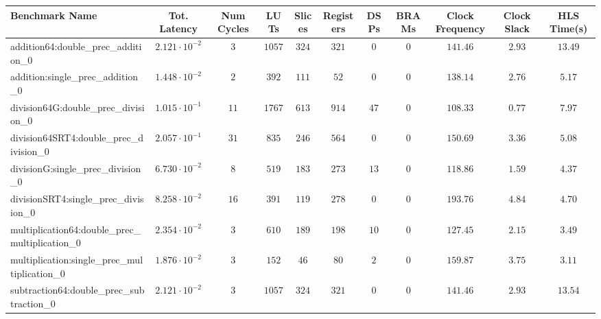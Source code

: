 \begin{tabular}{|l|c|c|c|c|c|c|c|c|c|c|}
\hline
Benchmark Name                                   & Tot. Latency            & Num Cycles & LUTs     & Slices   & Registers & DSPs   & BRAMs & Clock Frequency & Clock Slack & HLS Time(s) \\
\hline
addition64:double\_prec\_addition\_0             & $ 2.121 \cdot 10^{-2} $ & $ 3      $ & $ 1057 $ & $ 324  $ & $ 321   $ & $ 0  $ & $ 0 $ & $ 141.46      $ & $ 2.93    $ & $ 13.49   $ \\
addition:single\_prec\_addition\_0               & $ 1.448 \cdot 10^{-2} $ & $ 2      $ & $ 392  $ & $ 111  $ & $ 52    $ & $ 0  $ & $ 0 $ & $ 138.14      $ & $ 2.76    $ & $ 5.17    $ \\
division64G:double\_prec\_division\_0            & $ 1.015 \cdot 10^{-1} $ & $ 11     $ & $ 1767 $ & $ 613  $ & $ 914   $ & $ 47 $ & $ 0 $ & $ 108.33      $ & $ 0.77    $ & $ 7.97    $ \\
division64SRT4:double\_prec\_division\_0         & $ 2.057 \cdot 10^{-1} $ & $ 31     $ & $ 835  $ & $ 246  $ & $ 564   $ & $ 0  $ & $ 0 $ & $ 150.69      $ & $ 3.36    $ & $ 5.08    $ \\
divisionG:single\_prec\_division\_0              & $ 6.730 \cdot 10^{-2} $ & $ 8      $ & $ 519  $ & $ 183  $ & $ 273   $ & $ 13 $ & $ 0 $ & $ 118.86      $ & $ 1.59    $ & $ 4.37    $ \\
divisionSRT4:single\_prec\_division\_0           & $ 8.258 \cdot 10^{-2} $ & $ 16     $ & $ 391  $ & $ 119  $ & $ 278   $ & $ 0  $ & $ 0 $ & $ 193.76      $ & $ 4.84    $ & $ 4.70    $ \\
multiplication64:double\_prec\_multiplication\_0 & $ 2.354 \cdot 10^{-2} $ & $ 3      $ & $ 610  $ & $ 189  $ & $ 198   $ & $ 10 $ & $ 0 $ & $ 127.45      $ & $ 2.15    $ & $ 3.49    $ \\
multiplication:single\_prec\_multiplication\_0   & $ 1.876 \cdot 10^{-2} $ & $ 3      $ & $ 152  $ & $ 46   $ & $ 80    $ & $ 2  $ & $ 0 $ & $ 159.87      $ & $ 3.75    $ & $ 3.11    $ \\
subtraction64:double\_prec\_subtraction\_0       & $ 2.121 \cdot 10^{-2} $ & $ 3      $ & $ 1057 $ & $ 324  $ & $ 321   $ & $ 0  $ & $ 0 $ & $ 141.46      $ & $ 2.93    $ & $ 13.54   $ \\

\end{tabular}
